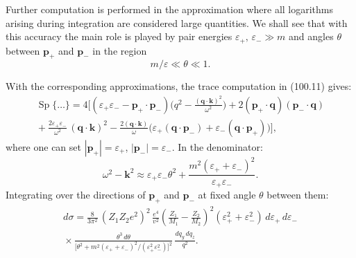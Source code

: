 Further computation is performed in the approximation where all logarithms arising during integration are considered large quantities. We shall see that with this accuracy the main role is played by pair energies $\varepsilon_+,\,\varepsilon_- \gg m$ and angles $\theta$ between $\mathbf{p}_+$ and $\mathbf{p}_-$ in the region
\begin{equation}
m/\varepsilon \ll \theta \ll 1.
\label{eq:100.12}
\end{equation}


With the corresponding approximations, the trace computation in (100.11) gives:
\begin{multline*}
\operatorname{Sp}\{\ldots\} = 4\biggl[(\varepsilon_+\varepsilon_- - \mathbf{p}_+\cdot\mathbf{p}_-)\biggl(q^2 - \frac{(\mathbf{q}\cdot\mathbf{k})^2}{\omega^2}\biggr) + 2(\mathbf{p}_+\cdot\mathbf{q})(\mathbf{p}_-\cdot\mathbf{q}) \\
{}+ \frac{2\varepsilon_+\varepsilon_-}{\omega^2}\,(\mathbf{q}\cdot\mathbf{k})^2 - \frac{2(\mathbf{q}\cdot\mathbf{k})}{\omega}\bigl(\varepsilon_+(\mathbf{q}\cdot\mathbf{p}_-) + \varepsilon_-(\mathbf{q}\cdot\mathbf{p}_+)\bigr)\biggr],
\end{multline*}
where one can set $|\mathbf{p}_+| = \varepsilon_+$, $|\mathbf{p}_-| = \varepsilon_-$. In the denominator:
\[
\omega^2 - \mathbf{k}^2 \approx \varepsilon_+\varepsilon_-\theta^2 + \frac{m^2(\varepsilon_+ + \varepsilon_-)^2}{\varepsilon_+\varepsilon_-}.
\]
Integrating over the directions of $\mathbf{p}_+$ and $\mathbf{p}_-$ at fixed angle $\theta$ between them:
\begin{multline}
d\sigma = \frac{8}{3\pi^2}\,(Z_1 Z_2 e^2)^2\,\frac{e^4}{v^2}\!\left(\frac{Z_1}{M_1} - \frac{Z_2}{M_2}\right)^{\!2}(\varepsilon_+^2 + \varepsilon_-^2)\,d\varepsilon_+\,d\varepsilon_- \\
{}\times \frac{\theta^3\,d\theta}{\bigl[\theta^2 + m^2(\varepsilon_+ + \varepsilon_-)^2/(\varepsilon_+^2\varepsilon_-^2)\bigr]^2}\,\frac{dq_y\,dq_z}{q^2}.
\label{eq:100.13}
\end{multline}

